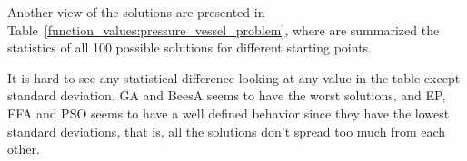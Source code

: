 

Another view of the solutions are presented in Table~\ref{function_values:pressure_vessel_problem}, where
are summarized the statistics of all 100 possible solutions for different starting points.

\begin{table}[H]
\centering
\caption{Statistical Information about function values for Pressure Vessel Design}
\end{table}

It is hard to see any statistical  difference looking at any value in the table except standard deviation.
GA and BeesA seems to have the worst solutions, and EP, FFA and PSO seems to have a well defined behavior
since they have the lowest standard deviations, that is, all the solutions don't spread too much from each
other.

